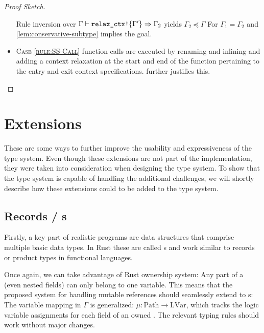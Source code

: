 \documentclass[twoside, english, final]{sdqthesis}
\theoremstyle{definition}
\begin{document}
\begin{proof}[Proof Sketch]
\begin{itemize}
    Rule inversion over $\Gamma \vdash \code{relax\_ctx!}\{\Gamma'\} \Rightarrow \Gamma_2$ yields $\Gamma_2 \preceq \Gamma$
    For $\Gamma_1 = \Gamma_2$ and \cref{lem:conservative-subtype} implies the goal.
  \item \textsc{Case \cref{rule:SS-Call}} function calls are executed by renaming and inlining and adding a context relaxation at the start and end of the function pertaining to the entry and exit context specifications.  further justifies this.
\end{itemize}
\end{proof}

\fi
\section{Extensions}\label{sec:extensions}

These are some ways to further improve the usability and expressiveness of the type system.
Even though these extensions are not part of the implementation, they were taken into consideration when designing the type system. To show that the type system is capable of handling the additional challenges, we will shortly describe how these extensions could to be added to the type system.

\subsection{Records / s}

Firstly, a key part of realistic programs are data structures that comprise multiple basic data types. In Rust these are called s and work similar to records or product types in functional languages. 

Once again, we can take advantage of Rust ownership system: Any part of a  (even nested fields) can only belong to one variable. This means that the proposed system for handling mutable references should seamlessly extend to s: 
The variable mapping in $\Gamma$ is generalized: $\mu : \text{Path} \to \text{LVar}$, which tracks the logic variable assignments for each field of an owned . The relevant typing rules should work without major changes.

\end{document}

